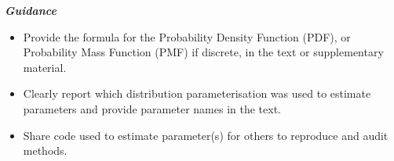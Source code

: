 \documentclass[
  10pt,
  letterpaper,
]{article}
\providecommand{\tightlist}{%
  \setlength{\itemsep}{0pt}\setlength{\parskip}{0pt}}\usepackage{longtable,booktabs,array}
\begin{document}
\begin{tcolorbox}[enhanced jigsaw, rightrule=.15mm, toprule=.15mm, colframe=quarto-callout-note-color-frame, arc=.35mm, leftrule=.75mm, opacityback=0, bottomrule=.15mm, breakable, left=2mm, colback=white]

\vspace{-3mm}\textbf{\emph{Guidance}}\vspace{3mm}

\begin{itemize}
\tightlist
\item
  Provide the formula for the Probability Density Function (PDF), or
  Probability Mass Function (PMF) if discrete, in the text or
  supplementary material.
\item
  Clearly report which distribution parameterisation was used to
  estimate parameters and provide parameter names in the text.
\item
  Share code used to estimate parameter(s) for others to reproduce and
  audit methods.
\end{itemize}

\end{tcolorbox}
\end{document}
